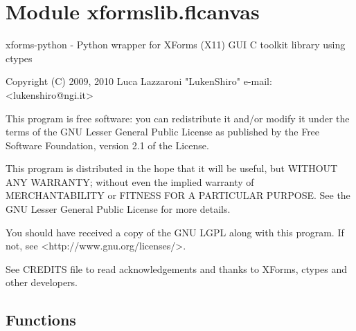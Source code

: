 %
%
%


\section{Module xformslib.flcanvas}

    \label{xformslib:flcanvas}
xforms-python - Python wrapper for XForms (X11) GUI C toolkit library using
ctypes

Copyright (C) 2009, 2010  Luca Lazzaroni "LukenShiro" e-mail: 
{\textless}lukenshiro@ngi.it{\textgreater}

This program is free software: you can redistribute it and/or modify it 
under the terms of the GNU Lesser General Public License as published by 
the Free Software Foundation, version 2.1 of the License.

This program is distributed in the hope that it will be useful, but WITHOUT
ANY WARRANTY; without even the implied warranty of MERCHANTABILITY or 
FITNESS FOR A PARTICULAR PURPOSE. See the GNU Lesser General Public License
for more details.

You should have received a copy of the GNU LGPL along with this program. If
not, see {\textless}http://www.gnu.org/licenses/{\textgreater}.

See CREDITS file to read acknowledgements and thanks to XForms, ctypes and 
other developers.



  \subsection{Functions}

    \label{xformslib:flcanvas:fl_create_generic_canvas}


